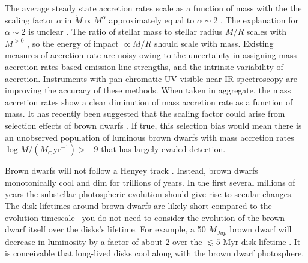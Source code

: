 The average steady state accretion rates scale as a function of mass with the the scaling factor $\alpha$ in $\dot{M}\propto M^\alpha$ approximately equal to $\alpha \sim 2$ \citep{2008A&A...481..423G,2006ApJ...639L..83A,2006A&A...452..245N,2009ApJ...696.1589H}.  The explanation for $\alpha \sim 2$ is unclear \citep{2006ApJ...648..484H}.  The ratio of stellar mass to stellar radius $M/R$ scales with $M^{>0}$ \citep{2009AIPC.1094..102C}, so the energy of impact $\propto M/R$ should scale with mass.  Existing measures of accretion rate are noisy owing to the uncertainty in assigning mass accretion rates based emission line strengths, and the intrinsic variability of accretion.  Instruments with pan-chromatic UV-visible-near-IR spectroscopy \citep{2011A&A...536A.105V,2012A&A...548A..56R} are improving the accuracy of these methods.  When taken in aggregate, the mass accretion rates show a clear diminution of mass accretion rate as a function of mass.  It has recently been suggested that the scaling factor could arise from selection effects of brown dwarfs \citep{2010MNRAS.409.1307M}.  If true, this selection bias would mean there is an unobserved population of luminous brown dwarfs with mass accretion rates $\log{\dot{M}/(M_{\odot}\mathrm{yr}^{-1})} >-9$ that has largely evaded detection.

Brown dwarfs will not follow a Henyey track \citep{1959ApJ...129....2H}.  Instead, brown dwarfs monotonically cool and dim for trillions of years.  In the first several millions of years the substellar photospheric evolution should give rise to secular changes.  The disk lifetimes around brown dwarfs are likely short compared to the evolution timescale-- you do not need to consider the evolution of the brown dwarf itself over the disks's lifetime.  For example, a 50 $M_{Jup}$ brown dwarf will decrease in luminosity by a factor of about 2 over the $\lesssim5$ Myr disk lifetime \citep{2002A&A...382..563B}.  It is conceivable that long-lived disks cool along with the brown dwarf photosphere.

